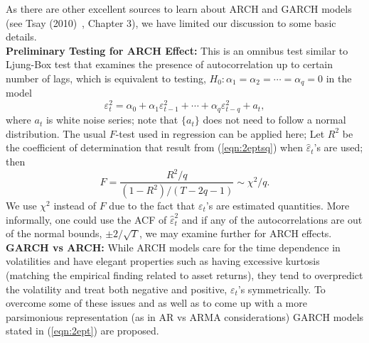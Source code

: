 As there are other excellent sources to learn about ARCH and GARCH models (see Tsay (2010)~\cite{tsay}, Chapter 3), we have limited our discussion to some basic details. \\


\noindent\textbf{Preliminary Testing for ARCH Effect:} This is an omnibus test similar to Ljung-Box test that examines the presence of autocorrelation up to certain number of lags, which is equivalent to testing, $H_0: \alpha_1 = \alpha_2= \cdots = \alpha_q = 0$ in the model
	\begin{equation}\label{eqn:2eptsq}
	\varepsilon_t^2 = \alpha_0 + \alpha_1\varepsilon_{t-1}^2 + \cdots + \alpha_q\varepsilon_{t-q}^2 + a_t,
	\end{equation}
where $a_t$ is white noise series; note that $\{a_t\}$ does not need to follow a normal distribution. The usual $F$-test used in regression can be applied here; Let $R^2$ be the coefficient of determination that result from (\ref{eqn:2eptsq}) when $\hat{\varepsilon}_t$'s are used; then
	\begin{equation}\label{eqn:2F}
	F = \frac{R^2/q}{(1 - R^2)/(T - 2q - 1)} \sim \chi^2/q.
	\end{equation}
We use $\chi^2$ instead of $F$ due to the fact that $\varepsilon_t$'s are estimated quantities. More informally, one could use the ACF of $\hat{\varepsilon}_t^2$ and if any of the autocorrelations are out of the normal bounds, $\pm 2/\sqrt{T}$, we may examine further for ARCH effects. \\


\noindent\textbf{GARCH vs ARCH:} While ARCH models care for the time dependence in volatilities and have elegant properties such as having excessive kurtosis (matching the empirical finding related to asset returns), they tend to overpredict the volatility and treat both negative and positive, $\varepsilon_t$'s symmetrically. To overcome some of these issues and as well as to come up with a more parsimonious representation (as in AR vs ARMA considerations) GARCH models stated in (\ref{eqn:2ept}) are proposed. \\


